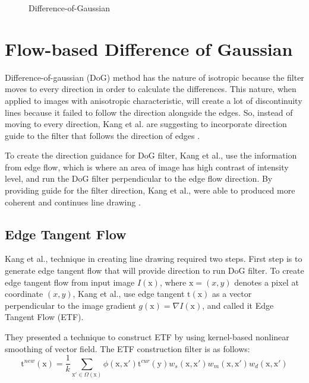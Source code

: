 \begin{figure}[H]
	\centering
	\caption{Difference-of-Gaussian}\label{fig:DoG}
\end{figure}

\section{Flow-based Difference of Gaussian} 
Difference-of-gaussian (DoG) method has the nature of isotropic because the filter moves to every direction in order to calculate the differences. This nature, when applied to images with anisotropic characteristic, will create a lot of discontinuity lines because it failed to follow the direction alongside the edges. So, instead of moving to every direction, Kang et al. are suggesting to incorporate direction guide to the filter that follows the direction of edges \cite{kang07}.

To create the direction guidance for DoG filter, Kang et al., use the information from edge flow, which is where an area of image has high contrast of intensity level, and run the DoG filter perpendicular to the edge flow direction. By providing guide for the filter direction, Kang et al., were able to produced more coherent and continues line drawing \cite{kang07}. 


\subsection{Edge Tangent Flow} 
Kang et al., technique in creating line drawing required two steps. First step is to generate edge tangent flow that will provide direction to run DoG filter. To create edge tangent flow from input image $ I(\mbox{x}) $, where $ \mbox{x} = (x,y)$ denotes a pixel at coordinate $(x,y)$, Kang et al., use edge tangent $\mbox{t}(\mbox{x}) $ as a vector perpendicular to the image gradient $ g(\mbox{x}) = \nabla I(\mbox{x})$, and called it Edge Tangent Flow (ETF). 

They presented a technique to construct ETF by using kernel-based nonlinear smoothing of vector field. The ETF construction filter is as follows:
\begin{equation}
	\mbox{t} ^{new}(\mbox{x} ) = \frac{1}{k} \sum_{\mathrm{x}' \in \Omega (\mathrm{x})} \phi (\mbox{x},\mbox{x}') \mbox{t} ^{cur} (\mbox{y}) w_s(\mbox{x},\mbox{x}') w_m(\mbox{x},\mbox{x}') w_d(\mbox{x},\mbox{x}')
\end{equation}

